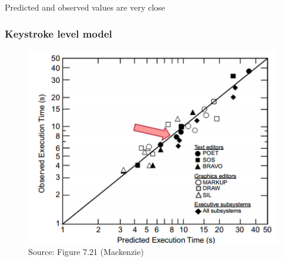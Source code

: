 \documentclass{beamer}
\begin{document}
\begin{frame}
	\centering
	Predicted and observed values are very close
	\frametitle{Keystroke level model}
	\begin{figure}
		\centering
		\includegraphics[width=.5\linewidth]{image/7-21}
		\caption{Source: Figure 7.21 (Mackenzie)}
	\end{figure}
\end{frame}


\end{document}
